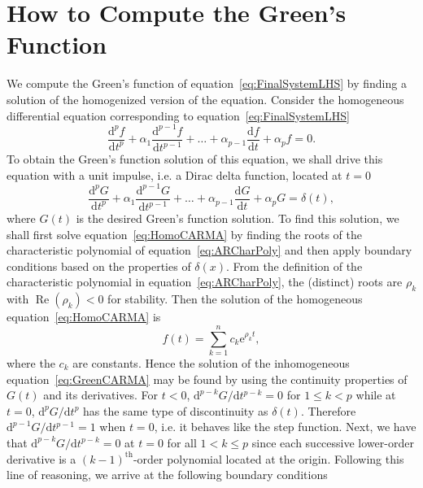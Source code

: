 \documentclass[a4paper,fleqn,usenatbib]{mnras}
\begin{document}
\section[Green's Function Computation]{How to Compute the Green's Function}\label{sec:GFComputation}

We compute the Green's function of equation~\eqref{eq:FinalSystemLHS} by finding a solution of the homogenized version of the equation. Consider the homogeneous differential equation corresponding to equation~\eqref{eq:FinalSystemLHS}
\begin{equation}\label{eq:HomoCARMA}
\frac{\mathrm{d}^{p}f}{\mathrm{d}t^{p}} + \alpha_{1} \frac{\mathrm{d}^{p-1}f}{\mathrm{d}t^{p-1}} + \ldots + \alpha_{p-1} \frac{\mathrm{d}f}{\mathrm{d}t} + \alpha_{p} f = 0.
\end{equation}
To obtain the Green's function solution of this equation, we shall drive this equation with a unit impulse, i.e. a Dirac delta function, located at $t = 0$
\begin{equation}\label{eq:GreenCARMA}
\frac{\mathrm{d}^{p}G}{\mathrm{d}t^{p}} + \alpha_{1} \frac{\mathrm{d}^{p-1}G}{\mathrm{d}t^{p-1}} + \ldots + \alpha_{p-1} \frac{\mathrm{d}G}{\mathrm{d}t} + \alpha_{p} G = \delta(t),
\end{equation}
where $G(t)$ is the desired Green's function solution. To find this solution, we shall first solve equation~\eqref{eq:HomoCARMA} by finding the roots of the characteristic polynomial of equation~\eqref{eq:ARCharPoly} and then apply boundary conditions based on the properties of $\delta(x)$. From the definition of the characteristic polynomial in equation~\eqref{eq:ARCharPoly}, the (distinct) roots are $\rho_{k}$ with $\operatorname{Re}(\rho_{k}) < 0$ for stability. Then the solution of the homogeneous equation~\eqref{eq:HomoCARMA} is 
\begin{equation}\label{eq:HomoSol}
f(t) = \sum_{k = 1}^{n} c_{k} \mathrm{e}^{\rho_{k}t},
\end{equation}
where the $c_{k}$ are constants. Hence the solution of the inhomogeneous equation~\eqref{eq:GreenCARMA} may be found by using the continuity properties of $G(t)$ and its derivatives. For $t < 0$, $\mathrm{d}^{p-k}G/\mathrm{d}t^{p-k} = 0$ for $1 \leq k < p$ while at $t = 0$, $\mathrm{d}^{p}G/\mathrm{d}t^{p}$ has the same type of discontinuity as $\delta(t)$. Therefore $\mathrm{d}^{p-1}G/\mathrm{d}t^{p-1} = 1$ when $t = 0$, i.e. it behaves like the step function. Next, we have that $\mathrm{d}^{p-k}G/\mathrm{d}t^{p-k} = 0$ at $t = 0$ for all $1 < k \leq p$ since each successive lower-order derivative is a $(k-1)^{\mathrm{th}}$-order polynomial located at the origin. Following this line of reasoning, we arrive at the following boundary conditions
\end{document}
